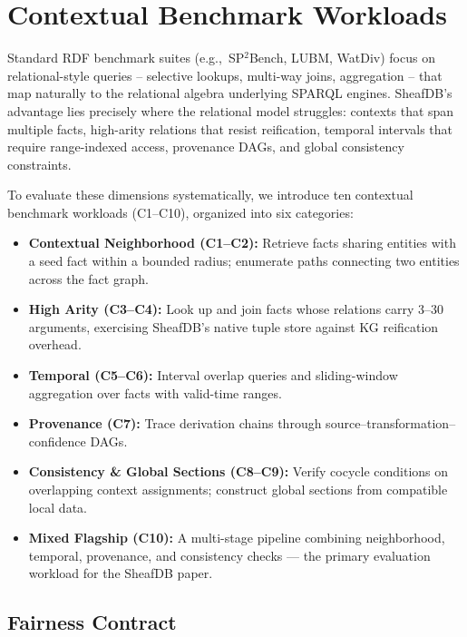 
\section{Contextual Benchmark Workloads}
\label{sec:contextual-workloads}

Standard RDF benchmark suites (e.g.,~SP$^2$Bench, LUBM, WatDiv) focus on
relational-style queries -- selective lookups, multi-way joins, aggregation --
that map naturally to the relational algebra underlying SPARQL engines.
SheafDB's advantage lies precisely where the relational model struggles:
contexts that span multiple facts, high-arity relations that resist
reification, temporal intervals that require range-indexed access,
provenance DAGs, and global consistency constraints.

To evaluate these dimensions systematically, we introduce ten contextual
benchmark workloads (C1--C10), organized into six categories:

\begin{itemize}
    \item \textbf{Contextual Neighborhood (C1--C2):} Retrieve facts sharing
    entities with a seed fact within a bounded radius; enumerate paths
    connecting two entities across the fact graph.
    \item \textbf{High Arity (C3--C4):} Look up and join facts whose
    relations carry 3--30 arguments, exercising SheafDB's native tuple
    store against KG reification overhead.
    \item \textbf{Temporal (C5--C6):} Interval overlap queries and
    sliding-window aggregation over facts with valid-time ranges.
    \item \textbf{Provenance (C7):} Trace derivation chains through
    source--transformation--confidence DAGs.
    \item \textbf{Consistency \& Global Sections (C8--C9):} Verify
    cocycle conditions on overlapping context assignments; construct
    global sections from compatible local data.
    \item \textbf{Mixed Flagship (C10):} A multi-stage pipeline combining
    neighborhood, temporal, provenance, and consistency checks --- the
    primary evaluation workload for the SheafDB paper.
\end{itemize}

\subsection{Fairness Contract}
\label{sec:fairness}

